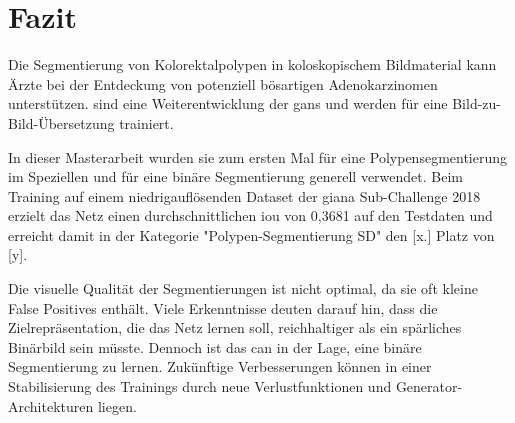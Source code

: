 \chapter{Fazit}

Die Segmentierung von Kolorektalpolypen in koloskopischem Bildmaterial kann Ärzte bei der Entdeckung von potenziell bösartigen Adenokarzinomen unterstützen.
 sind eine Weiterentwicklung der \glspl{gan} und werden für eine Bild-zu-Bild-Übersetzung trainiert.

In dieser Masterarbeit wurden sie zum ersten Mal für eine Polypensegmentierung im Speziellen und für eine binäre Segmentierung generell verwendet.
Beim Training auf einem niedrigauflösenden Dataset der \gls{giana} Sub-Challenge 2018 erzielt das Netz einen durchschnittlichen \gls{iou} von 0,3681 auf den Testdaten und erreicht damit in der Kategorie "Polypen-Segmentierung SD" den [x.] Platz von [y].

Die visuelle Qualität der Segmentierungen ist nicht optimal, da sie oft kleine False Positives enthält.
Viele Erkenntnisse deuten darauf hin, dass die Zielrepräsentation, die das Netz lernen soll, reichhaltiger als ein spärliches Binärbild sein müsste.
Dennoch ist das \gls{can} in der Lage, eine binäre Segmentierung zu lernen.
Zukünftige Verbesserungen können in einer Stabilisierung des Trainings durch neue Verlustfunktionen und Generator-Architekturen liegen.
